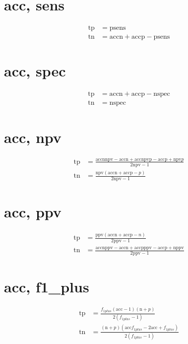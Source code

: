 \documentclass[3p,times]{elsarticle}
\begin{document}
\begin{footnotesize}
\begin{landscape}

\section{acc, sens}
\begin{align}
\mathrm{tp} &= \mathrm{p} \mathrm{sens}\\
\mathrm{tn} &= \mathrm{acc} \mathrm{n} + \mathrm{acc} \mathrm{p} - \mathrm{p} \mathrm{sens}
\end{align}
\section{acc, spec}
\begin{align}
\mathrm{tp} &= \mathrm{acc} \mathrm{n} + \mathrm{acc} \mathrm{p} - \mathrm{n} \mathrm{spec}\\
\mathrm{tn} &= \mathrm{n} \mathrm{spec}
\end{align}
\section{acc, npv}
\begin{align}
\mathrm{tp} &= \frac{\mathrm{acc} \mathrm{n} \mathrm{npv} - \mathrm{acc} \mathrm{n} + \mathrm{acc} \mathrm{npv} \mathrm{p} - \mathrm{acc} \mathrm{p} + \mathrm{npv} p}{2 \mathrm{npv} - 1}\\
\mathrm{tn} &= \frac{\mathrm{npv} \left(\mathrm{acc} \mathrm{n} + \mathrm{acc} \mathrm{p} - p\right)}{2 \mathrm{npv} - 1}
\end{align}
\section{acc, ppv}
\begin{align}
\mathrm{tp} &= \frac{\mathrm{ppv} \left(\mathrm{acc} \mathrm{n} + \mathrm{acc} \mathrm{p} - n\right)}{2 \mathrm{ppv} - 1}\\
\mathrm{tn} &= \frac{\mathrm{acc} \mathrm{n} \mathrm{ppv} - \mathrm{acc} \mathrm{n} + \mathrm{acc} \mathrm{p} \mathrm{ppv} - \mathrm{acc} \mathrm{p} + \mathrm{n} \mathrm{ppv}}{2 \mathrm{ppv} - 1}
\end{align}
\section{acc, f1_plus}
\begin{align}
\mathrm{tp} &= \frac{f_{1 plus} \left(\mathrm{acc} - 1\right) \left(\mathrm{n} + p\right)}{2 \left(f_{1 plus} - 1\right)}\\
\mathrm{tn} &= \frac{\left(\mathrm{n} + p\right) \left(\mathrm{acc} f_{1 plus} - 2 \mathrm{acc} + f_{1 plus}\right)}{2 \left(f_{1 plus} - 1\right)}
\end{align}

\end{landscape}
\end{footnotesize}
\end{document}

